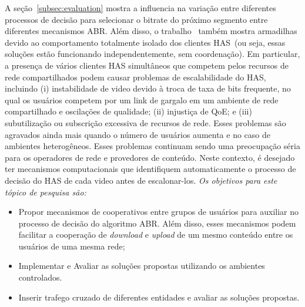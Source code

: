 A seção~\ref{subsec:evaluation} mostra a influencia na variação entre diferentes processos de decisão para selecionar o bitrate do próximo segmento entre diferentes mecanismos ABR. Além disso, o trabalho~\cite{bentaleb:2018:MSys} também mostra armadilhas devido ao comportamento totalmente isolado dos clientes HAS~(ou seja, essas soluções estão funcionando independentemente, sem coordenação). Em particular, a presença de vários clientes HAS simultâneos que competem pelos recursos de rede compartilhados podem causar problemas de escalabilidade do HAS, incluindo (i) instabilidade de video devido à troca de taxa de bits frequente, no qual os usuários competem por um link de gargalo em um ambiente de rede compartilhado e oscilações de qualidade; (ii) injustiça de QoE; e (iii) subutilização ou subscrição excessiva de recursos de rede. Esses problemas são agravados ainda mais quando o número de usuários aumenta e no caso de ambientes heterogêneos. Esses problemas continuam sendo uma preocupação séria para os operadores de rede e provedores de conteúdo. 
Neste contexto, é desejado ter mecanismos computacionais que identifiquem automaticamente o processo de decisão do HAS de cada video antes de escalonar-los.
\textit{Os objetivos para este tópico de pesquisa são:}

\begin{itemize}
    \item Propor mecanismos de cooperativos entre grupos de usuários para auxiliar no processo de decisão do algoritmo ABR. Além disso, esses mecanismos podem facilitar a cooperação de \textit{download} e \textit{upload} de um mesmo conteúdo entre os usuários de uma mesma rede; 
    \item Implementar e Avaliar as soluções propostas utilizando os ambientes controlados.
    \item Inserir trafego cruzado de diferentes entidades e avaliar as soluções propostas.
\end{itemize}


